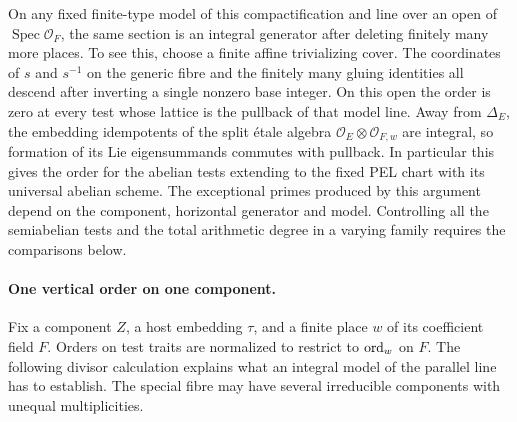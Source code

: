 On any fixed finite-type model of this compactification and line
over an open of \(\operatorname{Spec}\mathcal O_F\), the same
section is an integral generator after deleting finitely many more
places. To see this, choose a finite affine trivializing cover.
The coordinates of \(s\) and \(s^{-1}\) on the generic fibre and
the finitely many gluing identities all descend after inverting a
single nonzero base integer. On this open the order is zero at
every test whose lattice is the pullback of that model line.
Away from \(\Delta_E\), the embedding idempotents of the split
étale algebra \(\mathcal O_E\otimes\mathcal O_{F,w}\) are integral,
so formation of its Lie eigensummands commutes with pullback.
In particular this gives the order for the abelian tests extending
to the fixed PEL chart with its universal abelian scheme. The
exceptional primes produced by this argument depend on the
component, horizontal generator and model. Controlling all the
semiabelian tests and the total arithmetic degree in a varying
family requires the comparisons below.

\paragraph{One vertical order on one component.}
Fix a component \(Z\), a host embedding \(\tau\), and a finite place
\(w\) of its coefficient field \(F\). Orders on test traits are
normalized to restrict to \({\rm ord}_w\) on \(F\). The following
divisor calculation explains what an integral model of the parallel
line has to establish. The special fibre may have several irreducible
components with unequal multiplicities.

